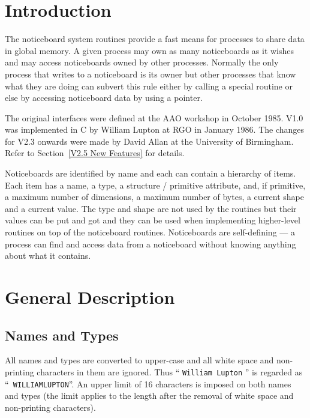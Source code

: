 \documentclass[twoside,11pt,nolof]{starlink}
\begin{document}
\scfrontmatter

\section {Introduction}



      The noticeboard system routines provide a fast means for processes to
      share data in global memory. A given process may own as many noticeboards
      as it wishes and may access noticeboards owned by other processes.
      Normally the only process that writes to a noticeboard is its owner but
      other processes that know what they are doing can subvert this rule
      either by calling a special routine or else by accessing noticeboard data
      by using a pointer.

      The original interfaces were defined at the {AAO} workshop in October
      1985. {V1.0} was implemented in C by William Lupton at {RGO} in January
      1986. The changes for {V2.3} onwards were made by David Allan at the University
      of Birmingham.
      Refer to Section~\ref{V2.5 New Features} for details.

      Noticeboards are identified by name and each can contain a hierarchy of
      items. Each item has a name, a type, a structure / primitive attribute,
      and, if primitive, a maximum number of dimensions, a maximum number of
      bytes, a current shape and a current value. The type and shape are not
      used by the routines but their values can be put and got and they can be
      used when implementing higher-level routines on top of the noticeboard
      routines. Noticeboards are self-defining --- a process can find and access
      data from a noticeboard without knowing anything about what it contains.

      \section {General Description}
      \subsection {Names and Types} All names and types are converted to
      upper-case and all white space and non-printing characters in them are
      ignored. Thus `` \texttt{William Lupton} '' is regarded as ``{\tt%
WILLIAMLUPTON}''. An
      upper limit of 16 characters is imposed on both names and types (the
      limit applies to the length after the removal of white space and
      non-printing characters).
\end{document}
